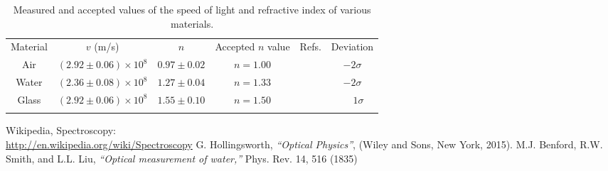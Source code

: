 \documentclass[aps,prl,reprint]{revtex4-2}
\begin{document}
\begin{widetext}
\begin{center}
\begin{table}[h]
\renewcommand{\arraystretch}{1.35}
\setlength{\tabcolsep}{10pt}
\caption{\label{}Measured and accepted values of the speed of light and refractive index of various materials.}
\begin{tabular}{|c|c|c|c|c|c|}
\toprule
Material & $v$ (m/s) & $n$ & Accepted $n$ value & Refs. & Deviation \\
\colrule
Air & $(2.92 \pm 0.06) \times 10^8$  & $0.97 \pm 0.02$ & $n=1.00$ & \cite{Hollingsworth} & $-2 \sigma$ \\
\colrule
Water & $(2.36 \pm 0.08) \times 10^8$  & $1.27 \pm 0.04$ & $n=1.33$ & \cite{Benford} & $-2\sigma$  \\
\colrule
Glass & $(2.92 \pm 0.06) \times 10^8$  & $1.55  \pm 0.10$ & $n = 1.50$ & \cite{Hollingsworth} & $\phantom{-}1 \sigma$ \\
\botrule
\end{tabular}
\end{table}
\end{center}
\end{widetext}





\begin{thebibliography}{9}
%
Wikipedia, Spectroscopy: \\
\href{http://en.wikipedia.org/wiki/Spectroscopy}{http://en.wikipedia.org/wiki/Spectroscopy}
%
G. Hollingsworth, \textit{“Optical Physics”}, (Wiley and Sons, New York, 2015).
%
M.J. Benford, R.W. Smith, and L.L. Liu,  
\textit{“Optical measurement of water,”}
Phys. Rev. 14, 516 (1835)
%
\end{thebibliography}
\end{document}
